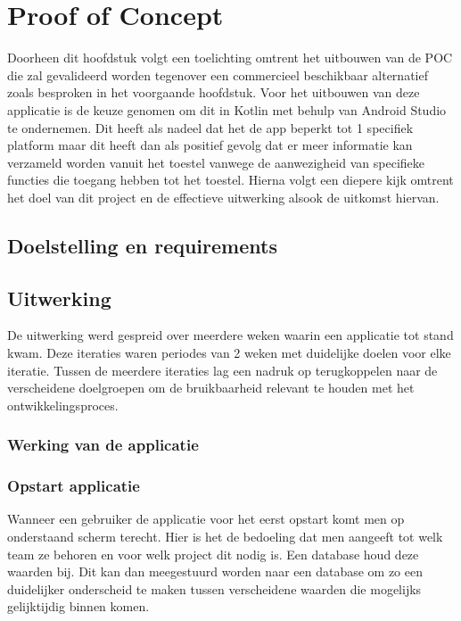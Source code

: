 \chapter{Proof of Concept}%
\label{ch:proofofconcept}

Doorheen dit hoofdstuk volgt een toelichting omtrent het uitbouwen van de POC die zal gevalideerd worden tegenover een commercieel beschikbaar alternatief zoals besproken in het voorgaande hoofdstuk. Voor het uitbouwen van deze applicatie is de keuze genomen om dit in Kotlin met behulp van Android Studio te ondernemen. Dit heeft als nadeel dat het de app beperkt tot 1 specifiek platform maar dit heeft dan als positief gevolg dat er meer informatie kan verzameld worden vanuit het toestel vanwege de aanwezigheid van specifieke functies die toegang hebben tot het toestel. Hierna volgt een diepere kijk omtrent het doel van dit project en de effectieve uitwerking alsook de uitkomst hiervan. 

\section{Doelstelling en requirements}

\section{Uitwerking}

De uitwerking werd gespreid over meerdere weken waarin een applicatie tot stand kwam. Deze iteraties waren periodes van 2 weken met duidelijke doelen voor elke iteratie. Tussen de meerdere iteraties lag een nadruk op terugkoppelen naar de verscheidene doelgroepen om de bruikbaarheid relevant te houden met het ontwikkelingsproces. 

\subsection{Werking van de applicatie}

\subsection{Opstart applicatie}

Wanneer een gebruiker de applicatie voor het eerst opstart komt men op onderstaand scherm terecht. Hier is het de bedoeling dat men aangeeft tot welk team ze behoren en voor welk project dit nodig is. Een database houd deze waarden bij. Dit kan dan meegestuurd worden naar een database om zo een duidelijker onderscheid te maken tussen verscheidene waarden die mogelijks gelijktijdig binnen komen. 

